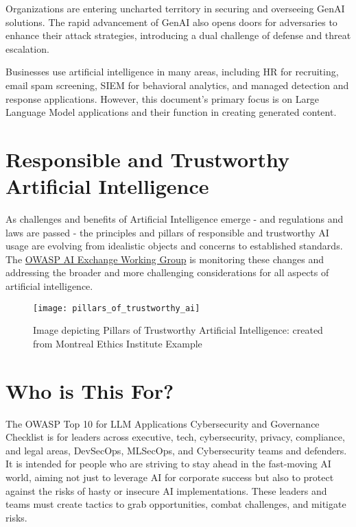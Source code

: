 Organizations are entering uncharted territory in securing and overseeing GenAI solutions. The rapid advancement of GenAI also opens doors for adversaries to enhance their attack strategies, introducing a dual challenge of defense and threat escalation.

\clearpage

Businesses use artificial intelligence in many areas, including HR for recruiting, email spam screening, SIEM for behavioral analytics, and managed detection and response applications. However, this document's primary focus is on Large Language Model applications and their function in creating generated content.

\section{Responsible and Trustworthy Artificial Intelligence}
As challenges and benefits of Artificial Intelligence emerge - and regulations and laws are passed - the principles and pillars of responsible and trustworthy AI usage are evolving from idealistic objects and concerns to established standards.
The \href{https://owasp-ai-exchange.web.app/}{OWASP AI Exchange Working Group} is monitoring these changes and addressing the broader and more challenging considerations for all aspects of artificial intelligence.

\begin{figure}[h]
  \centering
  \texttt{[image: pillars\_of\_trustworthy\_ai]}
  \caption{Image depicting Pillars of Trustworthy Artificial Intelligence: created from Montreal Ethics Institute Example}
  \label{fig:pillars-of-trustworthy-ai}
\end{figure}

\clearpage

\section{Who is This For?}
The OWASP Top 10 for LLM Applications Cybersecurity and Governance Checklist is for leaders across executive, tech, cybersecurity, privacy, compliance, and legal areas, DevSecOps, MLSecOps, and Cybersecurity teams and defenders. It is intended for people who are striving to stay ahead in the fast-moving AI world, aiming not just to leverage AI for corporate success but also to protect against the risks of hasty or insecure AI implementations. These leaders and teams must create tactics to grab opportunities, combat challenges, and mitigate risks.

